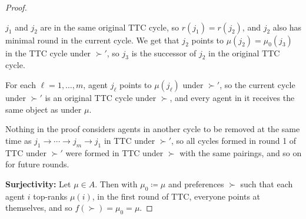 \begin{proof}
\begin{description}
			$j_1$ and $j_2$ are in the same original TTC cycle, so $r(j_1) = r(j_2)$, and $j_2$ also has minimal round in the current cycle. We get that $j_2$ points to $\mu(j_2) = \mu_0(j_3)$ in the TTC cycle under $\succ'$, so $j_3$ is the successor of $j_2$ in the original TTC cycle.

			For each $\ell = 1,\ldots,m$, agent $j_\ell$ points to $\mu(j_\ell)$ under $\succ'$, so the current cycle under $\succ'$ is an original TTC cycle under $\succ$, and every agent in it receives the same object as under $\mu.$

			Nothing in the proof considers agents in another cycle to be removed at the same time as $j_1 \to \cdots \to j_m \to j_1$ in TTC under $\succ'$, so all cycles formed in round 1 of TTC under $\succ'$ were formed in TTC under $\succ$ with the same pairings, and so on for future rounds.
	\end{description}

	\textbf{Surjectivity:}
	Let $\mu \in A$. Then with $\mu_0 \coloneqq \mu$ and preferences $\succ$ such that each agent $i$ top-ranks $\mu(i)$, in the first round of TTC, everyone points at themselves, and so $f(\succ) = \mu_0 = \mu$.
\end{proof}

